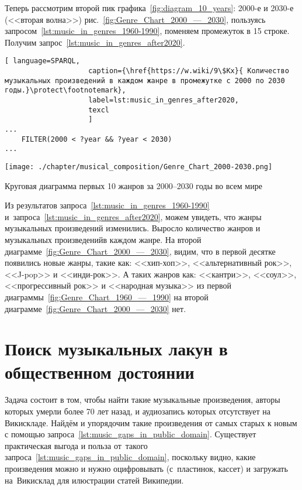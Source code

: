 \newpage
Теперь рассмотрим второй пик графика~\ref{fig:diagram_10_years}: 2000-е и 2030-е (<<вторая волна>>) рис.~\ref{fig:Genre_Chart_2000_—_2030}, пользуясь запросом~\ref{lst:music_in_genres_1960-1990}, поменяем промежуток в 15 строке. Получим запрос~\ref{lst:music_in_genres_after2020}.

\begin{lstlisting}[ language=SPARQL,
                    caption={\href{https://w.wiki/9\$Kx}{ Количество музыкальных произведений в каждом жанре в промежутке с 2000 по 2030 годы.}\protect\footnotemark},
                    label=lst:music_in_genres_after2020,
                    texcl 
                    ]
...
    FILTER(2000 < ?year && ?year < 2030)
...
\end{lstlisting}%

\begin{marginfigure}[0\baselineskip]
	\texttt{[image: ./chapter/musical\_composition/Genre\_Chart\_2000-2030.png]}
	\caption{Круговая диаграмма первых 10 жанров за 2000--2030 годы во всем мире}%
	\label{fig:Genre_Chart_2000_—_2030}%
\end{marginfigure}

Из результатов запроса~\ref{lst:music_in_genres_1960-1990} 
и~запроса~\ref{lst:music_in_genres_after2020}, можем увидеть, что жанры музыкальных произведений изменились.
Выросло количество жанров и музыкальных произведенийв каждом жанре. 
На второй диаграмме~\ref{fig:Genre_Chart_2000_—_2030}, видим, что в первой десятке появились новые жанры, такие как: <<хип-хоп>>, <<альтернативный рок>>, <<J-pop>> и <<инди-рок>>. А таких жанров как: <<кантри>>, <<соул>>, <<прогрессивный рок>> и <<народная музыка>> из первой диаграммы~\ref{fig:Genre_Chart_1960_—_1990} на второй диаграмме~\ref{fig:Genre_Chart_2000_—_2030} нет.




\newpage
\section{Поиск музыкальных лакун в общественном достоянии}

Задача состоит в том, чтобы найти такие музыкальные произведения, 
авторы которых умерли более 70 лет назад, 
и аудиозапись которых отсутствует на Викискладе. 
Найдём и упорядочим такие произведения от самых старых к новым 
с помощью запроса~\ref{lst:music_gaps_in_public_domain}. 
Существует практическая выгода и польза от~такого запроса~\ref{lst:music_gaps_in_public_domain}, 
поскольку видно, какие произведения можно и нужно оцифровывать 
(с~пластинок, кассет) и загружать на~Викисклад для илюстрации статей Википедии.

